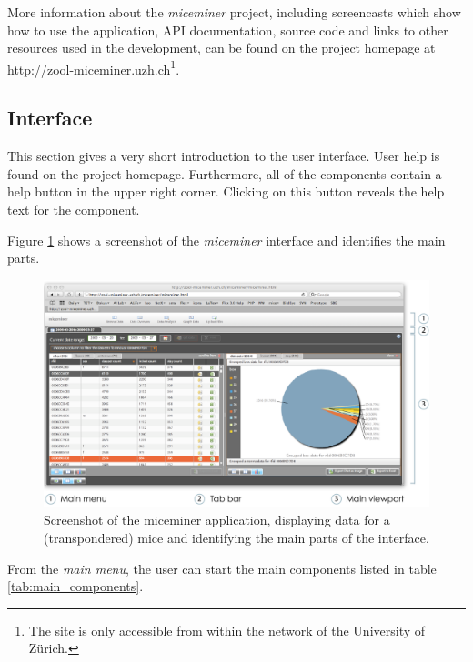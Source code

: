 More information about the \textit{miceminer} project, including screencasts which show how to use the application, \ac{API} documentation, source code and links to other resources used in the development, can be found on the project homepage at \href{http://zool-miceminer.uzh.ch/}{http://zool-miceminer.uzh.ch}\footnote{The site is only accessible from within the network of the University of Z\"urich.}. 

\subsection{Interface}
\label{subsec:miceminer_interface}

This section gives a very short introduction to the user interface. User help is found on the project homepage. Furthermore, all of the components contain a help button in the upper right corner. Clicking on this button reveals the help text for the component.

Figure \ref{fig:interface_overview} shows a screenshot of the \textit{miceminer} interface and identifies the main parts.

\begin{figure}[!ht]
\begin{center}
  \includegraphics[width=\textwidth]{assets/pdf/interface_overview.pdf}
  \caption[miceminer interface overview]{Screenshot of the miceminer application, displaying data for a (transpondered) mice and identifying the main parts of the interface.}
  \label{fig:interface_overview}
\end{center}
\end{figure}

From the \textit{main menu}, the user can start the main components listed in table \ref{tab:main_components}.


